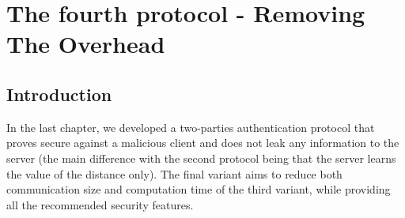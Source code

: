 \chapter{The fourth protocol - Removing The Overhead}
\label{chap:fourthProtocol}

\ifpdf
    \graphicspath{{Chapter7/Figs/Raster/}{Chapter7/Figs/PDF/}{Chapter7/Figs/}}
\else
    \graphicspath{{Chapter7/Figs/Vector/}{Chapter7/Figs/}}
\fi


\section{Introduction}
\label{sec:6intro}
In the last chapter, we developed a two-parties authentication protocol that
proves secure against a malicious client and does not leak any information to the
server (the main difference with the second protocol being that the server learns the
value of the distance only). The final variant aims to reduce both communication
size and computation time of the third variant, while providing all the recommended security
features.
